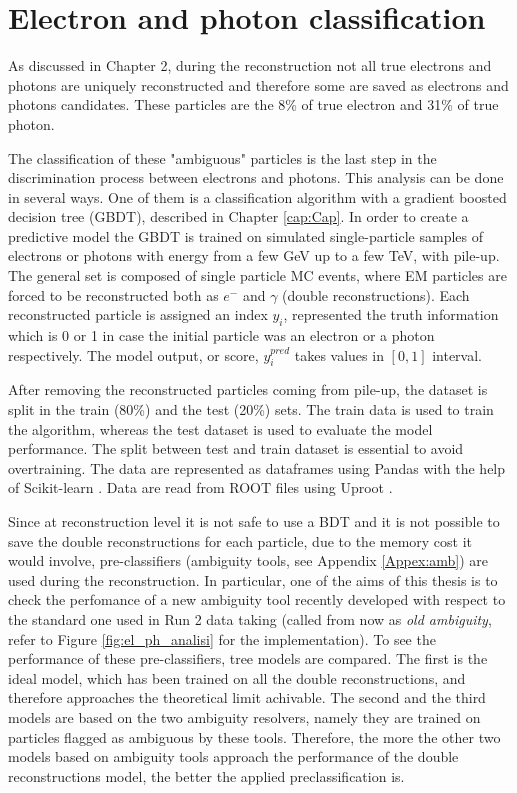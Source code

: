 \documentclass[a4paper, oneside, 11pt, openright]{book}
\begin{document}
	\chapter{Electron and photon classification} \label{cap:4}	
		As discussed in Chapter 2, during the reconstruction not all true electrons and photons are uniquely reconstructed and therefore some are saved as electrons and photons candidates. These particles are the 8\% of true electron and 31\% of true photon. 
		
		The classification of these "ambiguous" particles is the last step in the discrimination process between electrons and photons. This analysis can be done in several ways. One of them is a classification algorithm with a gradient boosted decision tree (GBDT), described in Chapter \ref{cap:Cap}. In order to create a predictive model the GBDT is trained on simulated single-particle samples of electrons or photons  with energy from a few GeV up to a few TeV, with pile-up. The general set is composed of single particle MC events, where EM particles are forced to be reconstructed both as $e^-$ and $\gamma$ (double reconstructions). Each reconstructed particle is assigned an index $y_i$, represented the truth information which is 0 or 1 in case the initial particle was an electron or a photon respectively. The model output, or score, $y_i^{pred}$ takes values in $[0,1]$ interval.
		
		After removing the reconstructed particles coming from pile-up, the dataset is split in the train (80\%) and the test (20\%) sets. The train data is used to train the algorithm, whereas the test dataset is used to evaluate the model performance. The split between test and train dataset is essential to avoid overtraining. The data are represented as dataframes using Pandas \cite{Pandas} with the help of Scikit-learn \cite{SKlearn}. Data are read from ROOT \cite{Root} files using Uproot \cite{Uproot}. 
		
		Since at reconstruction level it is not safe to use a BDT and it is not possible to save the double reconstructions for each particle, due to the memory cost it would involve, pre-classifiers (ambiguity tools, see Appendix \ref{Appex:amb}) are used during the reconstruction. In particular, one of the aims of this thesis is to check the perfomance of a new ambiguity tool recently developed with respect to the standard one used in Run 2 data taking (called from now as \textit{old ambiguity}, refer to Figure \ref{fig:el_ph_analisi} for the implementation). To see the performance of these pre-classifiers, tree models are compared. The first is the ideal model, which has been trained on all the double reconstructions, and therefore approaches the theoretical limit achivable. The second and the third models are based on the two ambiguity resolvers, namely they are trained on particles flagged as ambiguous by these tools. Therefore, the more the other two models based on ambiguity tools approach the performance of the double reconstructions model, the better the applied preclassification is.
		
\end{document}

